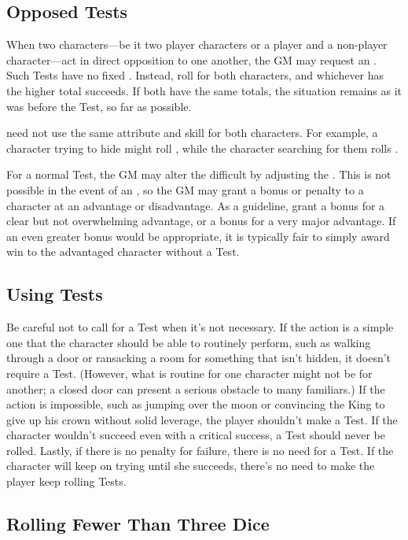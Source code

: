 \subsection{Opposed Tests}

When two characters---be it two player characters or a player and a non-player character---act in direct opposition to one another, the GM may request an {\opposedtest}.
Such Tests have no fixed {\tn}.
Instead, roll for both characters, and whichever has the higher total succeeds.
If both have the same totals, the situation remains as it was before the Test, so far as possible.

{\opposedtests} need not use the same attribute and skill for both characters.
For example, a character trying to hide might roll , while the character searching for them rolls .

For a normal Test, the GM may alter the difficult by adjusting the {\tn}.
This is not possible in the event of an {\opposedtest}, so the GM may grant a bonus or penalty to a character at an advantage or disadvantage.
As a guideline, grant a  bonus for a clear but not overwhelming advantage, or a  bonus for a very major advantage.
If an even greater bonus would be appropriate, it is typically fair to simply award win to the advantaged character without a Test.

\subsection{Using Tests}

Be careful not to call for a Test when it's not necessary.
If the action is a simple one that the character should be able to routinely perform, such as walking through a door or ransacking a room for something that isn't hidden, it doesn't require a Test.
(However, what is routine for one character might not be for another; a closed door can present a serious obstacle to many familiars.)
If the action is impossible, such as jumping over the moon or convincing the King to give up his crown without solid leverage, the player shouldn't make a Test.
If the character wouldn't succeed even with a critical success, a Test should never be rolled.
Lastly, if there is no penalty for failure, there is no need for a Test.
If the character will keep on trying until she succeeds, there's no need to make the player keep rolling Tests.

\subsection{Rolling Fewer Than Three Dice}

